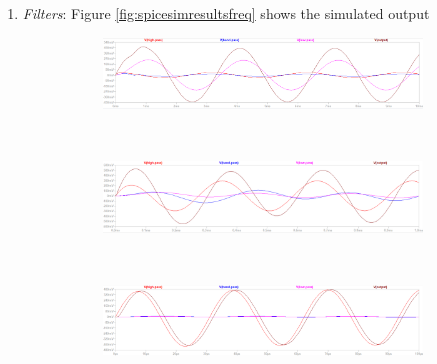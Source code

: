 \documentclass[notitlepage, 12pt]{report}
\begin{document}
\begin{enumerate}
    \item \emph{Filters}: Figure \ref{fig:spicesimresultsfreq} shows the simulated output
    \begin{figure}    
        \begin{subfigure}{0.3\textwidth}
            \includegraphics[scale=0.5]{images/spicesimresults320.png}
        \end{subfigure}\\
            \begin{subfigure}{0.3\textwidth}
            \includegraphics[scale=0.5]{images/spicesimresults3200.png}
        \end{subfigure}\\
        \begin{subfigure}{0.3\textwidth}
            \includegraphics[scale=0.5]{images/spicesimresults32000.png}
        \end{subfigure}    
    

\end{figure}
\end{enumerate}
\end{document}
